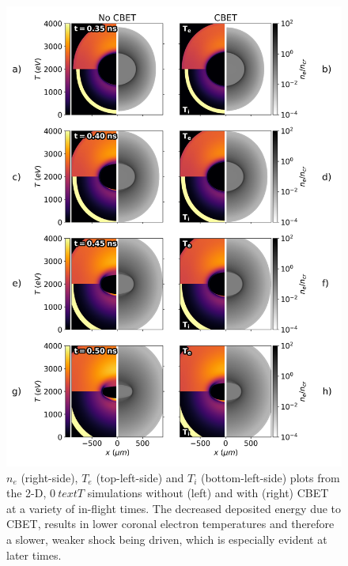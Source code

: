 \begin{figure}[t!]
    \includegraphics[width=0.95\linewidth]{Results2/Images/unmag_CBET_onoff.png}
    \centering
    \caption{$n_e$ (right-side), $T_e$ (top-left-side) and $T_i$ (bottom-left-side) plots from the 2-D, $0\ text{T}$ simulations without (left) and with (right) \ac{CBET} at a variety of in-flight times.
    The decreased deposited energy due to \ac{CBET}, results in lower coronal electron temperatures and therefore a slower, weaker shock being driven, which is especially evident at later times.}%
    \label{fig:Res2_unmag_CBET_onoff}
\end{figure}



